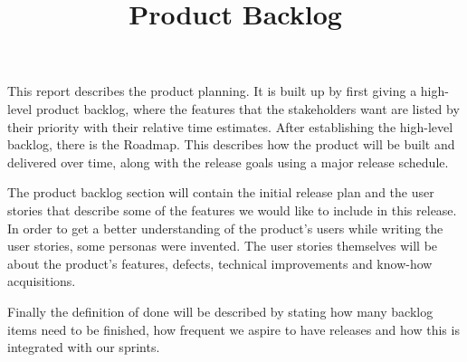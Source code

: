 \documentclass{article}
\begin{document}
\title{Product Backlog}
\date{}
\maketitle

This report describes the product planning. It is built up by first giving a high-level product backlog, where the features that the stakeholders want are listed by their priority with their relative time estimates. After establishing the high-level backlog, there is the Roadmap. This describes how the product will be built and delivered over time, along with the release goals using a major release schedule. 

The product backlog section will contain the initial release plan and the user stories that describe some of the features we would like to include in this release. In order to get a better understanding of the product's users while writing the user stories, some personas were invented. The user stories themselves will be about the product's features, defects, technical improvements and know-how acquisitions.

Finally the definition of done will be described by stating how many backlog items need to be finished, how frequent we aspire to have releases and how this is integrated with our sprints.
\end{document}
